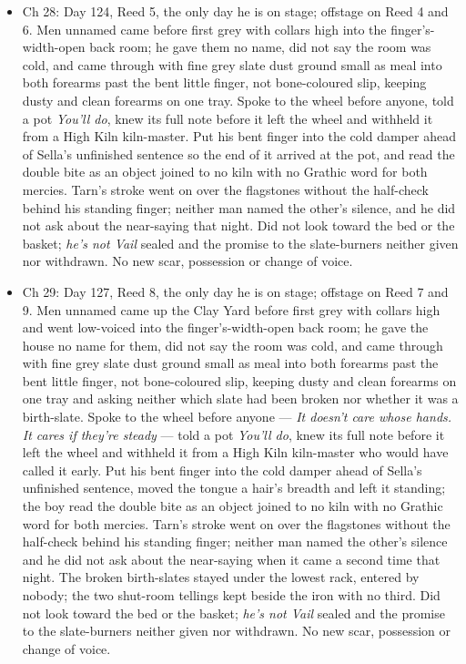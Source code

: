 \documentclass{design/chronicle}
\begin{document}
{\begin{itemize}[leftmargin=1.4em,itemsep=1pt,topsep=3pt,parsep=0pt]
\item Ch 28: Day 124, Reed 5, the only day he is on stage; offstage on Reed 4 and 6. Men unnamed came before first grey with collars high into the finger’s-width-open back room; he gave them no name, did not say the room was cold, and came through with fine grey slate dust ground small as meal into both forearms past the bent little finger, not bone-coloured slip, keeping dusty and clean forearms on one tray. Spoke to the wheel before anyone, told a pot \emph{You’ll do}, knew its full note before it left the wheel and withheld it from a High Kiln kiln-master. Put his bent finger into the cold damper ahead of Sella’s unfinished sentence so the end of it arrived at the pot, and read the double bite as an object joined to no kiln with no Grathic word for both mercies. Tarn’s stroke went on over the flagstones without the half-check behind his standing finger; neither man named the other’s silence, and he did not ask about the near-saying that night. Did not look toward the bed or the basket; \emph{he’s not Vail} sealed and the promise to the slate-burners neither given nor withdrawn. No new scar, possession or change of voice.

\end{itemize}

\begin{itemize}[leftmargin=1.4em,itemsep=1pt,topsep=3pt,parsep=0pt]

\item Ch 29: Day 127, Reed 8, the only day he is on stage; offstage on Reed 7 and 9. Men unnamed came up the Clay Yard before first grey with collars high and went low-voiced into the finger’s-width-open back room; he gave the house no name for them, did not say the room was cold, and came through with fine grey slate dust ground small as meal into both forearms past the bent little finger, not bone-coloured slip, keeping dusty and clean forearms on one tray and asking neither which slate had been broken nor whether it was a birth-slate. Spoke to the wheel before anyone — \emph{It doesn’t care whose hands. It cares if they’re steady} — told a pot \emph{You’ll do}, knew its full note before it left the wheel and withheld it from a High Kiln kiln-master who would have called it early. Put his bent finger into the cold damper ahead of Sella’s unfinished sentence, moved the tongue a hair’s breadth and left it standing; the boy read the double bite as an object joined to no kiln with no Grathic word for both mercies. Tarn’s stroke went on over the flagstones without the half-check behind his standing finger; neither man named the other’s silence and he did not ask about the near-saying when it came a second time that night. The broken birth-slates stayed under the lowest rack, entered by nobody; the two shut-room tellings kept beside the iron with no third. Did not look toward the bed or the basket; \emph{he’s not Vail} sealed and the promise to the slate-burners neither given nor withdrawn. No new scar, possession or change of voice.


\end{itemize}}
\end{document}
